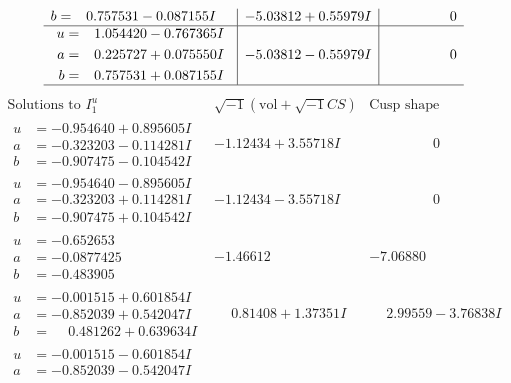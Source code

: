 \documentclass[1p]{elsarticle_modified}
\theoremstyle{definition}
\newcommand{\I}{\sqrt{-1}}
\begin{document}
$$\begin{array}{c|c|c}
\begin{aligned}
b &= \phantom{-}0.757531 - 0.087155 I\end{aligned}
 & -5.03812 + 0.55979 I & \phantom{-0.000000 } 0 \\ \hline\begin{aligned}
u &= \phantom{-}1.054420 - 0.767365 I \\
a &= \phantom{-}0.225727 + 0.075550 I \\
b &= \phantom{-}0.757531 + 0.087155 I\end{aligned}
 & -5.03812 - 0.55979 I & \phantom{-0.000000 } 0\\
 \hline 
 \end{array}$$\newpage$$\begin{array}{c|c|c}  
\text{Solutions to }I^u_{1}& \I (\text{vol} + \sqrt{-1}CS) & \text{Cusp shape}\\
 \hline 
\begin{aligned}
u &= -0.954640 + 0.895605 I \\
a &= -0.323203 - 0.114281 I \\
b &= -0.907475 - 0.104542 I\end{aligned}
 & -1.12434 + 3.55718 I & \phantom{-0.000000 } 0 \\ \hline\begin{aligned}
u &= -0.954640 - 0.895605 I \\
a &= -0.323203 + 0.114281 I \\
b &= -0.907475 + 0.104542 I\end{aligned}
 & -1.12434 - 3.55718 I & \phantom{-0.000000 } 0 \\ \hline\begin{aligned}
u &= -0.652653\phantom{ +0.000000I} \\
a &= -0.0877425\phantom{ +0.000000I} \\
b &= -0.483905\phantom{ +0.000000I}\end{aligned}
 & -1.46612\phantom{ +0.000000I} & -7.06880\phantom{ +0.000000I} \\ \hline\begin{aligned}
u &= -0.001515 + 0.601854 I \\
a &= -0.852039 + 0.542047 I \\
b &= \phantom{-}0.481262 + 0.639634 I\end{aligned}
 & \phantom{-}0.81408 + 1.37351 I & \phantom{-}2.99559 - 3.76838 I \\ \hline\begin{aligned}
u &= -0.001515 - 0.601854 I \\
a &= -0.852039 - 0.542047 I \\

\end{aligned}
\end{array}$$
\end{document}
